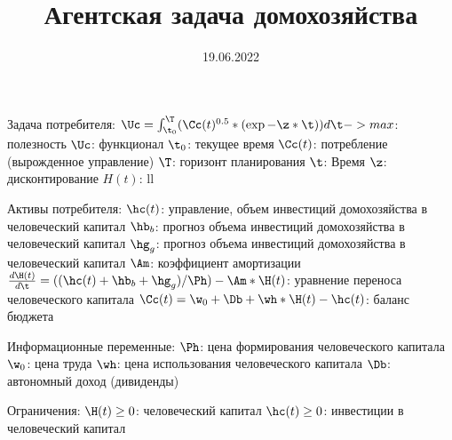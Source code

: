\documentclass[12pt]{article}
\title{Агентская задача домохозяйства}
\date{19.06.2022}
\begin{document}
Задача потребителя:
    $\Uc = \int_{\t_{0}}^\T (\Cc(t)^{0.5}*(\exp{-\z*\t}))d\t -> max$: полезность
    $\Uc$: функционал
    $\t_{0}$: текущее время
    $\Cc(t)$: потребление (вырожденное управление)
    $\T$: горизонт планирования
    $\t$: Время
    $\z$: дисконтирование
    $H(t)$: ll

Активы потребителя:
    $\hc(t)$: управление, объем инвестиций домохозяйства в человеческий капитал
    $\hb_{b}$: прогноз объема инвестиций домохозяйства в человеческий капитал
    $\hg_{g}$: прогноз объема инвестиций домохозяйства в человеческий капитал
    $\Am$: коэффициент амортизации
    $\frac{d\H(t)}{d\t} = ((\hc(t)+\hb_{b}+\hg_{g})/\Ph)-\Am*\H(t)$: уравнение переноса человеческого капитала
    $\Cc(t) = \w_{0}+\Db+\wh*\H(t)-\hc(t)$: баланс бюджета

Информационные переменные:
    $\Ph$: цена формирования человеческого капитала
    $\w_{0}$: цена труда
    $\wh$: цена использования человеческого капитала
    $\Db$: автономный доход (дивиденды)

Ограничения:
    $\H(t)\geq 0$: человеческий капитал
    $\hc(t)\geq 0$: инвестиции в человеческий капитал
\end{document}
